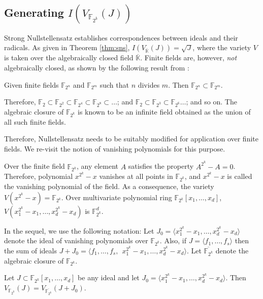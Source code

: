\subsection{Generating $I(V_{\mathbb{F}_{2^k}}(J))$}
Strong Nullstellensatz establishes correspondences between ideals and their radicals.
As given in Theorem \ref{thm:sns},  $I(V_{\overline {\mathbb{K}}}(J)) =\sqrt{J}$, where 
the variety $V$ is taken over the algebraically closed field
$\overline {\mathbb{K}}$. Finite fields are, however, {\it not}
algebraically closed, as shown by the following result from
\cite{galois_field:mceliece}:  

\begin{Theorem}
Given finite fields $\mathbb{F}_{2^n}$ and $\mathbb{F}_{2^m}$ such that $n$ divides
$m$. Then $\mathbb{F}_{2^n} \subset \mathbb{F}_{2^m}$.
\end{Theorem}

Therefore, $\mathbb{F}_2 \subset \mathbb{F}_{2^2} \subset
\mathbb{F}_{2^4} \subset \mathbb{F}_{2^8} \subset \dots$; and
$\mathbb{F}_2 \subset \mathbb{F}_{2^3} \subset \mathbb{F}_{2^6}  \dots
$; and so on. The algebraic closure of $\mathbb{F}_{2^k}$ is known to
be  an infinite field obtained as the union of all such finite fields.  


Therefore, Nullstellensatz needs to be suitably modified for
application over finite fields. 
We re-visit the notion of vanishing polynomials for this purpose. 

Over the finite field $\mathbb{F}_{2^k}$, any element $A$ satisfies
the property $A^{2^k}-A=0$. Therefore, polynomial  $x^{2^k}-x$
vanishes at all points in $\mathbb{F}_{2^k}$, and $x^{2^k}-x$ is
called the vanishing polynomial of the field. As a consequence, the
variety $V(x^{2^k}-x)=\mathbb{F}_{2^k}$. Over multivariate polynomial
ring $\mathbb{F}_{2^k}[x_1,\dots,x_d]$,
$V(x_1^{2^k}-x_1,\dots,x_d^{2^k}-x_d)$ is $\mathbb{F}_{2^k}^d$. 
 
In the sequel, we use the following notation: 
Let $J_0=\langle x_1^{2^k}-x_1,\dots,x_d^{2^k}-x_d \rangle $ denote
the ideal of vanishing polynomials over $\mathbb{F}_{2^k}$. Also, if
$J=\langle f_1,\dots,f_s \rangle$ 
then the sum of ideals $J+J_0=\langle f_1,\dots,f_s ,
~~x_1^{2^k}-x_1,\dots,x_d^{2^k}-x_d \rangle$.  Let $\overline
{\mathbb{F}_{2^k}}$ denote the algebraic closure of
$\mathbb{F}_{2^k}$. 

\begin{Lemma} \label{lem:closure}
Let $J \subset \mathbb{F}_{2^k}[x_1,\dots,x_d]$ be any ideal and let
$J_0=\langle x_1^{2^k}-x_1,\dots,x_d^{2^k}-x_d \rangle$. Then
$V_{\mathbb{F}_{2^k}}(J)=V_{\overline {\mathbb{F}_{2^k}}}(J+J_0)$. 
\end{Lemma}

